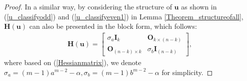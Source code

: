 \begin{proof}
%
%
%

In a similar way, 
by  considering  the  structure of   $\mathbf u$ as  shown in  (\ref{u_classifyodd})  and  (\ref{u_classifyeven1}) in Lemma \ref{Theorem_structureofall}, 
$\mathbf  H(\mathbf u)$  can   also be  presented in  the  block  form,  which  follows: 
\begin{align}\label{Hblock}
\mathbf  H(\mathbf u)
=
\begin{bmatrix}
 \sigma_{a} 	\mathbf I_{k}     &  \mathbf O_{k \times (n-k)}   \\  
\mathbf O_{(n-k) \times k }   &    \sigma_{b} \mathbf I_{(n-k)}
\end{bmatrix},
\end{align}
where 
based on (\ref{Hessianmatrix}), 
we denote 
$ 
 \sigma_{a} =  (m-1) a^{m-2}-\alpha, 
\sigma_{b}  =(m-1) b^{m-2}-\alpha $
for  simplicity.


\end{proof}
